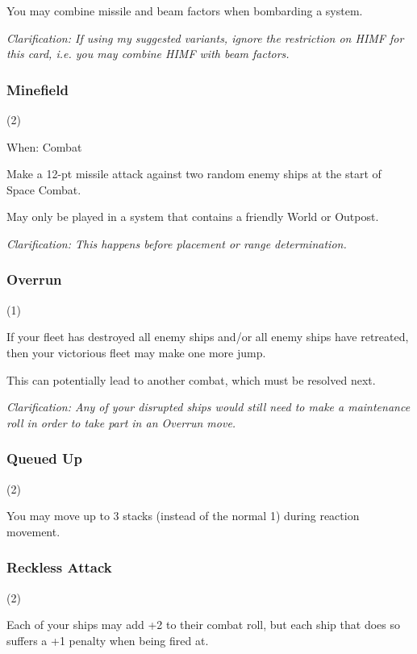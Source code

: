 \documentclass[a4paper,11pt,twocolumn]{article}
\begin{document}
You may combine missile and beam factors when bombarding a system.

\textit{Clarification: If using my suggested variants, ignore the restriction on HIMF for this card, i.e. you may combine HIMF with beam factors.}

\subsubsection{Minefield} (2)

When: Combat

Make a 12-pt missile attack against two random enemy ships at the start of Space Combat.

May only be played in a system that contains a friendly World or Outpost.

\textit{Clarification: This happens before placement or range determination.}

\subsubsection{Overrun} (1)


If your fleet has destroyed all enemy ships and/or all enemy ships have retreated, then your victorious fleet may make one more jump.

This can potentially lead to another combat, which must be resolved next.

\textit{Clarification: Any of your disrupted ships would still need to make a maintenance roll in order to take part in an Overrun move.}

\subsubsection{Queued Up} (2)


You may move up to 3 stacks (instead of the normal 1) during reaction movement.

\subsubsection{Reckless Attack} (2)


Each of your ships may add +2 to their combat roll, but each ship that does so suffers a +1 penalty when being fired at.
\end{document}
